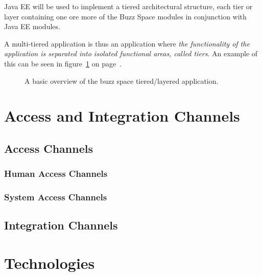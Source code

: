 \documentclass[a4paper,12pt,titlepage]{article}
\begin{document}
Java EE will be used to implement a tiered architectural structure, each tier or layer containing one ore more of the Buzz Space modules in conjunction with Java EE modules. 

A multi-tiered application is thus an application where \textit{the functionality of the application is separated into isolated functional areas, called tiers}. An example of this can be seen in figure~\ref{fig:refarchandmvc} on page~\pageref{fig:refarchandmvc}.
\begin{figure}[H]
	\centering
	\caption{A basic overview of the buzz space tiered/layered application.}
	\label{fig:refarchandmvc}
\end{figure}
\newpage
\section{Access and Integration Channels}
\subsection{Access Channels}
\subsubsection{Human Access Channels}%

\subsubsection{System Access Channels}%
	
\subsection{Integration Channels}%
	
\newpage
\section{Technologies}%

\end{document}
